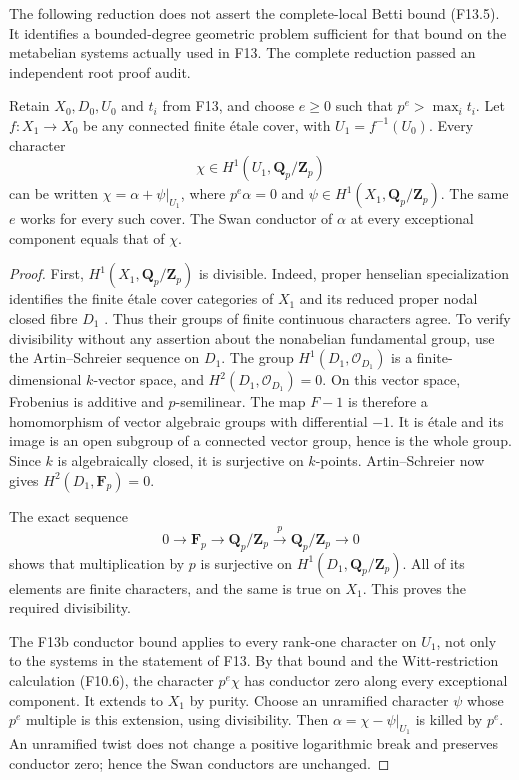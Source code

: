 The following reduction does not assert the complete-local Betti bound
(F13.5). It identifies a bounded-degree geometric problem sufficient for
that bound on the metabelian systems actually used in F13. The
complete reduction passed an independent root proof audit.

\begin{lemma}
Retain $X_0,D_0,U_0$ and $t_i$ from F13, and choose $e\geq0$
such that $p^e>\max_i t_i$. Let $f:X_1\to X_0$ be any connected
finite \'etale cover, with $U_1=f^{-1}(U_0)$. Every character
\[
 \chi\in H^1(U_1,\mathbf Q_p/\mathbf Z_p)
\]
can be written $\chi=\alpha+\psi|_{U_1}$, where
$p^e\alpha=0$ and $\psi\in H^1(X_1,\mathbf Q_p/\mathbf Z_p)$.
The same $e$ works for every such cover. The Swan conductor of
$\alpha$ at every exceptional component equals that of $\chi$.
\end{lemma}
\begin{proof}
First, $H^1(X_1,\mathbf Q_p/\mathbf Z_p)$ is divisible. Indeed,
proper henselian specialization identifies the finite \'etale cover
categories of $X_1$ and its reduced proper nodal closed fibre $D_1$
\cite[Lemma 58.9.1, tag 0A48]{StacksProperEtaleSpecialization}.
Thus their groups of finite continuous characters agree. To verify
divisibility without any assertion about the nonabelian fundamental
group, use the Artin--Schreier sequence on $D_1$. The group
$H^1(D_1,\mathcal O_{D_1})$ is a finite-dimensional $k$-vector space,
and $H^2(D_1,\mathcal O_{D_1})=0$. On this vector space, Frobenius
is additive and $p$-semilinear. The map $F-1$ is therefore a
homomorphism of vector algebraic groups with differential $-1$.
It is \'etale and its image is an open subgroup of a connected
vector group, hence is the whole group. Since $k$ is algebraically
closed, it is surjective on $k$-points. Artin--Schreier now gives
$H^2(D_1,\mathbf F_p)=0$.

The exact sequence
\[
 0\longrightarrow\mathbf F_p\longrightarrow
 \mathbf Q_p/\mathbf Z_p\xrightarrow{p}
 \mathbf Q_p/\mathbf Z_p\longrightarrow0
\]
shows that multiplication by $p$ is surjective on
$H^1(D_1,\mathbf Q_p/\mathbf Z_p)$. All of its elements are finite
characters, and the same is true on $X_1$. This proves the required
divisibility.

The F13b conductor bound applies to every rank-one character on
$U_1$, not only to the systems in the statement of F13.
By that bound and the Witt-restriction calculation (F10.6), the character
$p^e\chi$ has conductor zero along every exceptional component.
It extends to $X_1$ by purity. Choose an unramified character
$\psi$ whose $p^e$ multiple is this extension, using divisibility.
Then $\alpha=\chi-\psi|_{U_1}$ is killed by $p^e$. An unramified
twist does not change a positive logarithmic break and preserves
conductor zero; hence the Swan conductors are unchanged.
\end{proof}

